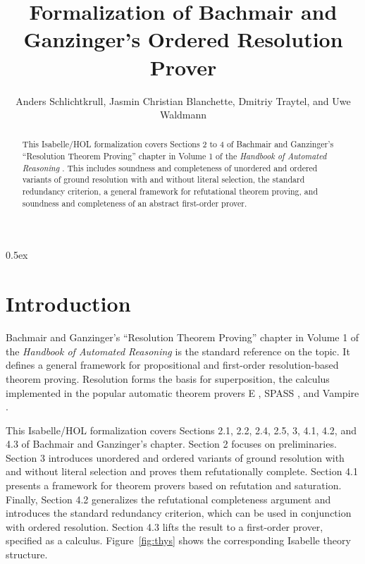 \documentclass[10pt,a4paper]{article}
\begin{document}
\title{Formalization of Bachmair and Ganzinger's Ordered Resolution Prover}
\author{Anders Schlichtkrull, Jasmin Christian Blanchette, Dmitriy Traytel, and Uwe Waldmann}

\maketitle

\begin{abstract}
\noindent
This Isabelle/HOL formalization covers Sections 2 to 4 of Bachmair and
Ganzinger's ``Resolution Theorem Proving'' chapter
\cite{bachmair-ganzinger-2001} in Volume 1 of the \emph{Handbook of Automated
Reasoning} \cite{robinson-voronkov-2001-vol1}. This includes soundness and
completeness of unordered and ordered variants of ground resolution with and
without literal selection, the standard redundancy criterion, a general
framework for refutational theorem proving, and soundness and completeness of
an abstract first-order prover.
\end{abstract}

\tableofcontents

\parindent 0pt
\parskip 0.5ex

\section{Introduction}

Bachmair and Ganzinger's ``Resolution Theorem Proving'' chapter
\cite{bachmair-ganzinger-2001} in Volume 1 of the \emph{Handbook of Automated
Reasoning} \cite{robinson-voronkov-2001-vol1} is the standard reference on the
topic. It defines a general framework for propositional and first-order
resolution-based theorem proving. Resolution forms the basis for superposition,
the calculus implemented in the popular automatic theorem provers E
\cite{schulz-2013}, SPASS \cite{weidenbach-et-al-2009}, and Vampire
\cite{hoder-voronkov-2010}.

\medskip

This Isabelle/HOL formalization covers Sections 2.1, 2.2, 2.4, 2.5, 3, 4.1,
4.2, and 4.3 of Bachmair and Ganzinger's chapter. Section 2 focuses on
preliminaries. Section 3 introduces unordered and ordered variants of ground
resolution with and without literal selection and proves them refutationally
complete. Section 4.1 presents a framework for theorem provers based on
refutation and saturation. Finally, Section 4.2 generalizes the refutational
completeness argument and introduces the standard redundancy criterion, which
can be used in conjunction with ordered resolution. Section 4.3 lifts the
result to a first-order prover, specified as a calculus. Figure~\ref{fig:thys}
shows the corresponding Isabelle theory structure.
\end{document}
